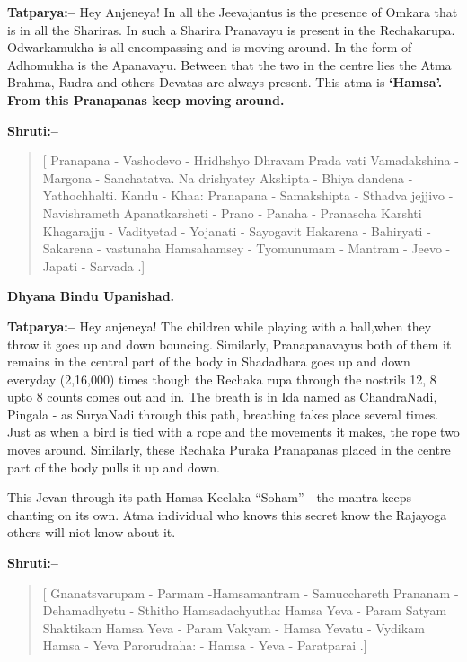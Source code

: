 \vskip 8pt

\textbf{Tatparya:–} Hey Anjeneya! In all the Jeevajantus is the presence of Omkara that is in all the Shariras. In such a Sharira Pranavayu is present in the Rechakarupa. Odwarkamukha is all encompassing and is moving around. In the form of Adhomukha is the Apanavayu. Between that the two in the centre lies the Atma Brahma, Rudra and others Devatas are always present. This atma is \textbf{‘Hamsa’. From this Pranapanas keep moving around.}

\vskip 10pt

\textbf{Shruti:–}

\begin{verse}
[ Pranapana - Vashodevo - Hridhshyo Dhravam Prada vati  Vamadakshina - Margona - Sanchatatva. Na drishyatey  Akshipta - Bhiya dandena - Yathochhalti. Kandu - Khaa:  Pranapana - Samakshipta - Sthadva jejjivo - Navishrameth  Apanatkarsheti - Prano - Panaha - Pranascha Karshti  Khagarajju - Vadityetad - Yojanati - Sayogavit  Hakarena - Bahiryati - Sakarena - vastunaha  Hamsahamsey - Tyomunumam - Mantram - Jeevo - Japati - Sarvada .]
\end{verse}

\begin{flushright}
\textbf{Dhyana Bindu Upanishad.}
\end{flushright}

\textbf{Tatparya:–} Hey anjeneya! The children while playing with a ball,\break when they throw it goes up and down bouncing. Similarly, Pranapanavayus both of them it remains in the central part of the body in Shadadhara goes up and down everyday (2,16,000) times though the Rechaka rupa through the nostrils 12, 8 upto 8 counts comes out and in. The breath is in Ida named as ChandraNadi, Pingala - as SuryaNadi through this path, breathing takes place several times. Just as when a bird is tied with a rope and the movements it makes, the rope two moves around. Similarly, these Rechaka Puraka Pranapanas placed in the centre part of the body pulls it up and down.

This Jevan through its path Hamsa Keelaka “Soham” - the mantra keeps chanting on its own. Atma individual who knows this secret know the Rajayoga others will niot know about it.

\textbf{Shruti:–}

\begin{verse}
[ Gnanatsvarupam - Parmam -Hamsamantram - Samucchareth  Prananam - Dehamadhyetu - Sthitho Hamsadachyutha:  Hamsa Yeva - Param Satyam Shakti\break kam  Hamsa Yeva - Param Vakyam - Hamsa Yevatu - Vydikam  Hamsa - Yeva Parorudraha: - Hamsa - Yeva - Paratparai .]
\end{verse}

